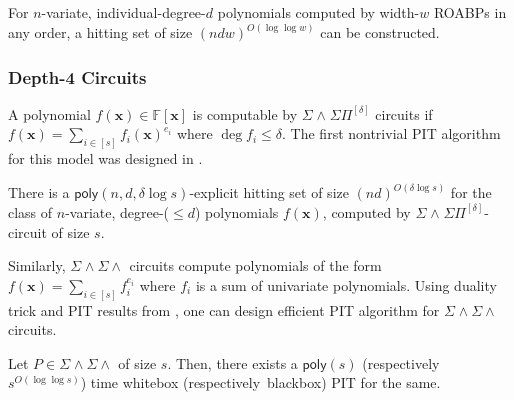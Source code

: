 \documentclass[10pt,a4paper]{article}
\newcommand{\poly}{\mathsf{poly}}
\newcommand{\F}{\mathbb{F}}
\newcommand{\x}{{\boldsymbol x}}
\newcommand{\SWSP}[3]{\Sigma^{#1}\!\wedge^{#2}\!\Sigma\Pi^{#3}}
\newcommand{\SWSU}[2]{\Sigma^{#1}\!\wedge\!\Sigma\!\wedge^{#2}}
\numberwithin{equation}{section}
\begin{document}
\begin{theorem} \label{thm:roabp-blackbox-pit}
For $n$-variate, individual-degree-$d$ polynomials computed by width-$w$ ROABPs in any order, a hitting set of size $(ndw)^{O(\log \log w)}$ can be constructed.
\end{theorem}

\subsubsection*{Depth-4 Circuits}

A polynomial $f(\x) \in \F[\x]$ is computable by $\SWSP{}{}{[\delta]}$ circuits if $ f(\x) = \sum_{i \in [s]} f_i(\x)^{e_i}$ where $\deg f_i \leq \delta$. The first nontrivial PIT algorithm for this model was designed in \cite{forbes2015deterministic}.

\begin{theorem} \label{thm:swsp-hs}
There is a $\poly(n,d, \delta \log s)$-explicit hitting set of size $(nd)^{O(\delta \log s)}$ for the class of $n$-variate, degree-($\le d$) polynomials $f(\x)$, computed by $\SWSP{}{}{[\delta]}$-circuit of size $s$.
\end{theorem}

Similarly, $\SWSU{}{}{}$ circuits compute polynomials of the form $f(\x) = \sum_{ i \in [s] } f_i^{e_i}$ where $f_i$ is a sum of univariate polynomials. Using duality trick \cite{saxena2008diagonal} and PIT results from \cite{raz2005deterministic,gurjarARO}, one can design efficient PIT algorithm for $\SWSU{}{}{}$ circuits.

\begin{lemma} [PIT for $\SWSU{}{}$-circuits]\label{lem:swsu-hs}
Let  $P \in \SWSU{}{}$ of size $s$. Then, there exists a $\poly(s)$ (respectively~$s^{O(\log \log s)}$) time whitebox (respectively~blackbox) PIT for the same.
\end{lemma}
\end{document}
